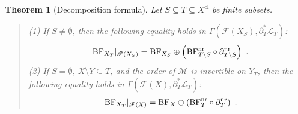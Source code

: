 \documentclass[a4paper]{amsart}
\newtheorem{thm}{Theorem}[section]
\theoremstyle{definition}
\numberwithin{equation}{section}
\begin{document}
\begin{thm}[Decomposition formula]\label{Decomp-formula} Let $S\subseteq T\subseteq X^\mathrm{cl}$ be finite subsets.
\begin{quote}
    (1) If $S\neq\emptyset$, then the following equality holds in $\Gamma(\mathscr{F}(X_S),\partial_T^\ast\mathscr{L}_T)$:
    \begin{align*}
        \mathrm{BF}_{X_T}|_{\mathscr{F}(X_S)}=\mathrm{BF}_{X_S}\oplus\left(\mathrm{BF}_{T\setminus S}^\mathrm{nr}\circ\partial^\mathrm{nr}_{T\setminus S}\right)\rlap{\ .}
    \end{align*}
    (2) If $S=\emptyset$, $X\setminus Y\subseteq T$, and the order of $\mathcal{M}$ is invertible on $Y_T$, then the following equality holds in $\Gamma(\mathscr{F}(X),\partial_T^\ast\mathscr{L}_T)$:
    \begin{align*}
        \mathrm{BF}_{X_T}|_{\mathscr{F}(X)}=\mathrm{BF}_X\oplus\left(\mathrm{BF}_T^\mathrm{nr}\circ\partial_T^\mathrm{nr}\right)\rlap{\ .}
    \end{align*}
\end{quote}
\end{thm}
\end{document}
